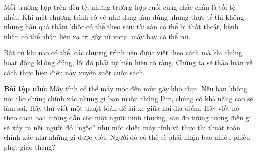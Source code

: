 Mỗi trường hợp trên đều tệ, nhưng trường hợp cuối cùng chắc chắn là tồi tệ nhất. Khi một chương trình có vẻ như đang làm đúng nhưng thực tế thì không, những hậu quả thảm khốc có thể theo sau: tài sản có thể bị thất thoát, bệnh nhân có thể nhận liều xạ trị gây tử vong, máy bay có thể rơi.

Bất cứ khi nào có thể, các chương trình nên được viết theo cách mà khi chúng hoạt động không đúng, lỗi đó phải tự hiển hiện rõ ràng. Chúng ta sẽ thảo luận về cách thực hiện điều này xuyên suốt cuốn sách.

\noindent \textbf{Bài tập nhỏ:} Máy tính có thể máy móc đến mức gây khó chịu. Nếu bạn không nói cho chúng chính xác những gì bạn muốn chúng làm, chúng có khả năng cao sẽ làm sai. Hãy thử viết một thuật toán để lái xe giữa hai địa điểm. Hãy viết nó theo cách bạn hướng dẫn cho một người bình thường, sau đó tưởng tượng điều gì sẽ xảy ra nếu người đó ``ngốc'' như một chiếc máy tính và thực thi thuật toán chính xác như những gì được viết. Người đó có thể sẽ phải nhận bao nhiêu phiếu phạt giao thông?